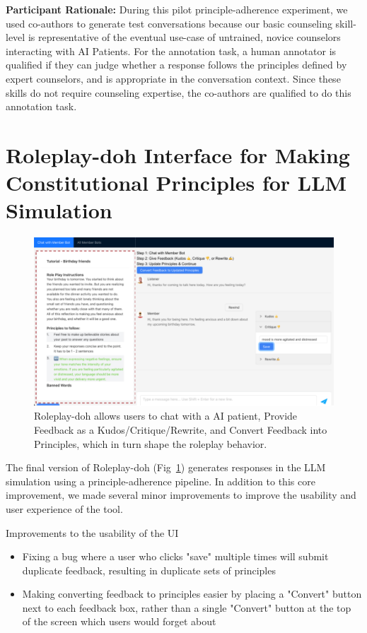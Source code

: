 \documentclass[11pt]{article}
\begin{document}
\textbf{Participant Rationale:} During this pilot principle-adherence experiment, we used co-authors to generate test conversations because our basic counseling skill-level is representative of the eventual use-case of untrained, novice counselors interacting with AI Patients. For the annotation task, a human annotator is qualified if they can judge whether a response follows the principles defined by expert counselors, and is appropriate in the conversation context. Since these skills do not require counseling expertise, the co-authors are qualified to do this annotation task.

\section{Roleplay-doh Interface for Making Constitutional Principles for LLM Simulation}
\label{sec:Roleplay-dohv1}
\begin{figure}[t]
    \centering
    \includegraphics[width=\textwidth]{figures/rpd-screenshot.png}
    \caption{Roleplay-doh allows users to chat with a AI patient, Provide Feedback as a Kudos/Critique/Rewrite, and Convert Feedback into Principles, which in turn shape the roleplay behavior.}
    \label{fig:rpd}
\end{figure}

The final version of Roleplay-doh (Fig~\ref{fig:rpd}) generates responses in the LLM simulation using a principle-adherence pipeline. In addition to this core improvement, we made several minor improvements to improve the usability and user experience of the tool. 

Improvements to the usability of the UI
\begin{itemize}
    \item Fixing a bug where a user who clicks "save" multiple times will submit duplicate feedback, resulting in duplicate sets of principles
    \item Making converting feedback to principles easier by placing a "Convert" button next to each feedback box, rather than a single "Convert" button at the top of the screen which users would forget about
\end{itemize}
\end{document}
